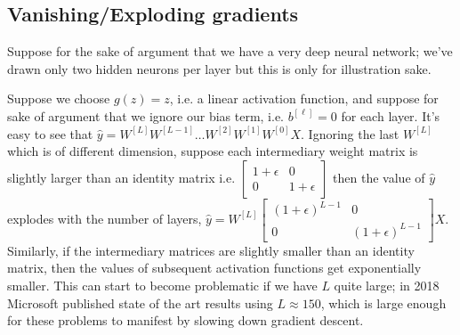 \documentclass[12pt]{article}
\begin{document}
\subsection{Vanishing/Exploding gradients}
Suppose for the sake of argument that we have a very deep neural network; we've drawn only two hidden neurons per layer but this is only for illustration sake.

\begin{figure}[h]
\centering
{}
\end{figure}

Suppose we choose $g(z) = z$, i.e. a linear activation function, and suppose for sake of argument that we ignore our bias term, i.e. $b^{[\ell]} = 0$ for each layer. It's easy to see that $\hat y = W^{[L]} W^{[L-1]} \ldots W^{[2]} W^{[1]} W^{[0]} X$. Ignoring the last $W^{[L]}$ which is of different dimension, suppose each intermediary weight matrix is slightly larger than an identity matrix i.e. $\begin{bmatrix}   1 + \epsilon & 0 \\ 0 & 1 + \epsilon \end{bmatrix}$ then the value of $\hat y$ explodes with the number of layers,
$\hat y = W^{[L]} \begin{bmatrix}   (1 + \epsilon)^{L-1} & 0 \\ 0 & (1 + \epsilon)^{L-1} \end{bmatrix}X$. Similarly, if the intermediary matrices are slightly smaller than an identity matrix, then the values of subsequent activation functions get exponentially smaller. This can start to become problematic if we have $L$ quite large; in 2018 Microsoft published state of the art results using $L \approx 150$, which is large enough for these problems to manifest by slowing down gradient descent.
\end{document}

